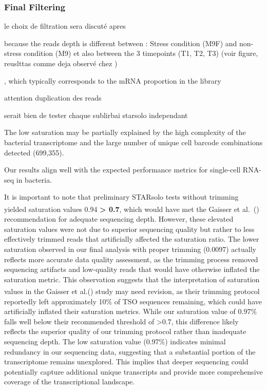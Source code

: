 \documentclass[
  11pt,
  a4paper,
]{report}
\makeatletter
\newcommand*\pandocbounded[1]{%
  \sbox\pandoc@box{#1}%
  \Gscale@div\@tempa{\textheight}{\dimexpr\ht\pandoc@box+\dp\pandoc@box\relax}%
  \Gscale@div\@tempb{\linewidth}{\wd\pandoc@box}%
  \ifdim\@tempb\p@<\@tempa\p@\let\@tempa\@tempb\fi%
  \ifdim\@tempa\p@<\p@\scalebox{\@tempa}{\usebox\pandoc@box}%
  \else\usebox{\pandoc@box}%
  \fi%
}
\makeatother
\begin{document}
\subsubsection{Final Filtering}\label{final-filtering}

\begin{figure}

\centering{

\pandocbounded{\texttt{[image: chapters/../figures/mRNA\_Genes\_filtered.png]}}

}

\caption{\label{fig-filtered_mRNA_violin}}

\end{figure}%

le choix de filtration sera discuté apres

because the reads depth is different between : Stress condition (M9F)
and non-stress condition (M9) et also between the 3 timepoints (T1, T2,
T3) (voir figure, reuslttas comme deja observé chez )

, which typically corresponds to the mRNA proportion in the library

attention duplication des reads

serait bien de tester chaque sublirbai starsolo independant

The low saturation may be partially explained by the high complexity of
the bacterial transcriptome and the large number of unique cell barcode
combinations detected (699,355).

Our results align well with the expected performance metrics for
single-cell RNA-seq in bacteria.

It is important to note that preliminary STARsolo tests without trimming
yielded saturation values 0.94 \textbf{\textgreater{} 0.7}, which would
have met the Gaisser et
al.~(\textsuperscript{}) recommendation
for adequate sequencing depth. However, these elevated saturation values
were not due to superior sequencing quality but rather to less
effectively trimmed reads that artificially affected the saturation
ratio. The lower saturation observed in our final analysis with proper
trimming (0.0097) actually reflects more accurate data quality
assessment, as the trimming process removed sequencing artifacts and
low-quality reads that would have otherwise inflated the saturation
metric. This observation suggests that the interpretation of saturation
values in the Gaisser et
al.(\textsuperscript{}) study may need
revision, as their trimming protocol reportedly left approximately 10\%
of TSO sequences remaining, which could have artificially inflated their
saturation metrics. While our saturation value of 0.97\% falls well
below their recommended threshold of \textgreater0.7, this difference
likely reflects the superior quality of our trimming protocol rather
than inadequate sequencing depth. The low saturation value (0.97\%)
indicates minimal redundancy in our sequencing data, suggesting that a
substantial portion of the transcriptome remains unexplored. This
implies that deeper sequencing could potentially capture additional
unique transcripts and provide more comprehensive coverage of the
transcriptional landscape.
\end{document}
